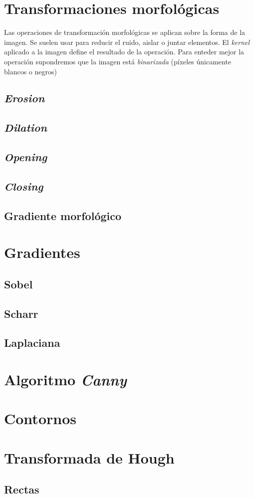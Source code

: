 \section{Transformaciones morfológicas}
Las operaciones de transformación morfológicas se aplican sobre la
forma de la imagen. Se suelen usar para reducir el ruido, aislar o
juntar elementos. El \emph{kernel} aplicado a la imagen define el
resultado de la operación. Para enteder mejor la operación supondremos
que la imagen está \emph{binarizada} (píxeles únicamente blancos o
negros)
\subsection{\emph{Erosion}}
\subsection{\emph{Dilation}}
\subsection{\emph{Opening}}
\subsection{\emph{Closing}}
\subsection{Gradiente morfológico}

\section{Gradientes}
\subsection{Sobel}
\subsection{Scharr}
\subsection{Laplaciana}

\section{Algoritmo \emph{Canny}}

\section{Contornos}

\section{Transformada de Hough}
\subsection{Rectas}